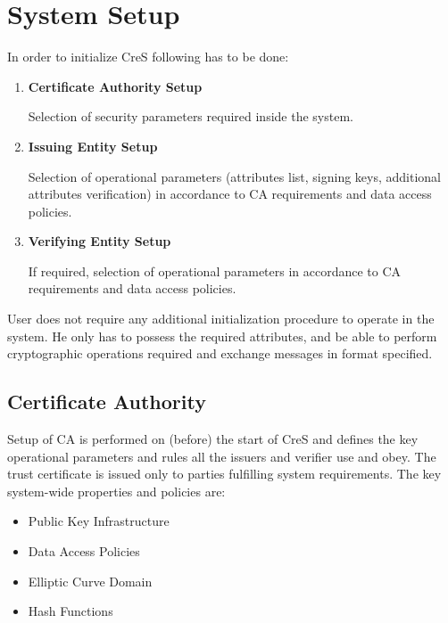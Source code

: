 \section{System Setup}
In order to initialize CreS following has to be done:
\begin{enumerate}
    \item \textbf{Certificate Authority Setup}
    
    Selection of security parameters required inside the system.
    
    \item \textbf{Issuing Entity Setup}
    
    Selection of operational parameters (attributes list, signing keys, additional attributes verification) in accordance to CA requirements and data access policies.
    
    \item \textbf{Verifying Entity Setup}
    
    If required, selection of operational parameters in accordance to CA requirements and data access policies.
\end{enumerate}
User does not require any additional initialization procedure to operate in the system. He only has to possess the required attributes, and be able to perform cryptographic operations required and exchange messages in format specified.


\subsection{Certificate Authority}

Setup of CA is performed on (before) the start of CreS and defines the key operational parameters and rules all the issuers and verifier use and obey. The trust certificate is issued only to parties fulfilling system requirements. The key system-wide properties and policies are: 
\begin{itemize}[label=$\circ$]
    \item Public Key Infrastructure
    \item Data Access Policies
    \item Elliptic Curve Domain
    \item Hash Functions
\end{itemize}


